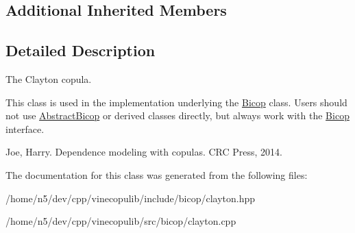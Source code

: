 \subsection*{Additional Inherited Members}


\subsection{Detailed Description}
The Clayton copula. 

This class is used in the implementation underlying the \hyperlink{classvinecopulib_1_1_bicop}{Bicop} class. Users should not use \hyperlink{classvinecopulib_1_1_abstract_bicop}{Abstract\+Bicop} or derived classes directly, but always work with the \hyperlink{classvinecopulib_1_1_bicop}{Bicop} interface.

Joe, Harry. Dependence modeling with copulas. C\+RC Press, 2014. 

The documentation for this class was generated from the following files\+:\begin{DoxyCompactItemize}
\item 
/home/n5/dev/cpp/vinecopulib/include/bicop/clayton.\+hpp\item 
/home/n5/dev/cpp/vinecopulib/src/bicop/clayton.\+cpp\end{DoxyCompactItemize}
